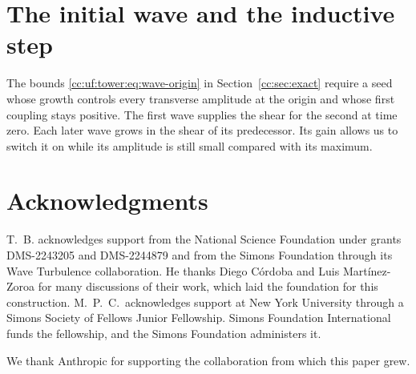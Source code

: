 \documentclass[11pt]{amsart}
\numberwithin{equation}{section}
\begin{document}





\section{The initial wave and the inductive step}\label{cc:sec:iteration}
The bounds \eqref{cc:uf:tower:eq:wave-origin} in
Section~\ref{cc:sec:exact} require a seed whose growth controls every
transverse amplitude at the origin and whose first coupling stays positive.
The first wave supplies the shear
for the second at time zero. Each later wave grows in the shear of its
predecessor. Its gain allows us to switch it on while its amplitude is
still small compared with its maximum.




\appendix





\section*{Acknowledgments}
T.~B. acknowledges support from the National Science Foundation under
grants DMS-2243205 and DMS-2244879 and from the Simons Foundation through
its Wave Turbulence collaboration. He thanks Diego C\'ordoba and Luis
Mart\'inez-Zoroa for many discussions of their work, which laid the
foundation for this construction.
M.~P.~C.\ acknowledges support at New York University through a Simons
Society of Fellows Junior Fellowship. Simons Foundation International
funds the fellowship, and the Simons Foundation administers it.

We thank Anthropic for supporting the collaboration from which this paper
grew.


\end{document}
